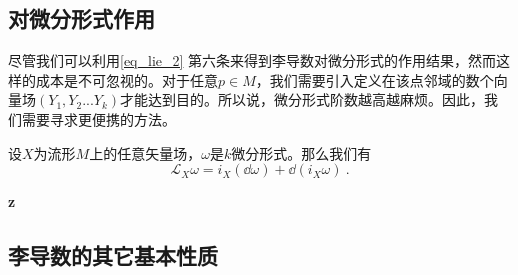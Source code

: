 \subsection{对微分形式作用}
尽管我们可以利用\autoref{eq_lie_2} 第六条来得到李导数对微分形式的作用结果，然而这样的成本是不可忽视的。对于任意$p\in M$，我们需要引入定义在该点邻域的数个向量场$(Y_1,Y_2...Y_k)$才能达到目的。所以说，微分形式阶数越高越麻烦。因此，我们需要寻求更便携的方法。
\begin{theorem}{}
设$X$为流形$M$上的任意矢量场，$\omega$是$k$微分形式。那么我们有
\begin{equation}
\mathcal L_X\omega=i_X(\dd \omega)+\dd(i_X\omega)~.
\end{equation}
\end{theorem}
\textbf{z}
\subsection{李导数的其它基本性质}
